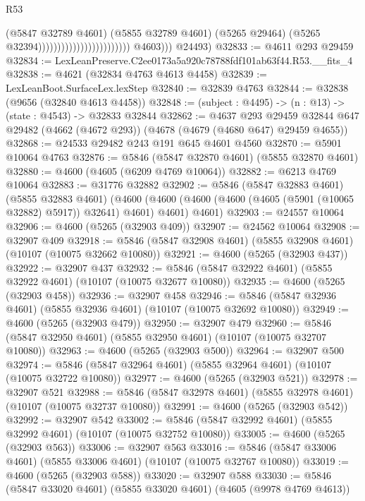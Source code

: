 \begin{lexlean}{R53}
\begin{coremodule}
                                                          (@5847 @32789 @4601)
                                                          (@5855 @32789 @4601)
                                                          (@5265 @29464)
                                                          (@5265 @32394))))))))))))))))))))))))
            @4603)))
      @24493)
@32833 := @4611 @293 @29459
@32834 := LexLeanPreserve.C2ee0173a5a920c78788fdf101ab63f44.R53.__fits_4
@32838 := @4621 (@32834 @4763 @4613 @4458)
@32839 := LexLeanBoot.SurfaceLex.lexStep
@32840 := @32839 @4763
@32844 := @32838 (@9656 (@32840 @4613 @4458))
@32848 := (subject : @4495) -> (n : @13) -> (state : @4543) -> @32833 @32844
@32862 := @4637
    @293
    @29459
    @32844
    @647
    @29482
    (@4662 (@4672 @293))
    (@4678 (@4679 (@4680 @647) @29459 @4655))
@32868 := @24533 @29482 @243 @191 @645 @4601 @4560
@32870 := @5901 @10064 @4763
@32876 := @5846 (@5847 @32870 @4601) (@5855 @32870 @4601)
@32880 := @4600 (@4605 (@6209 @4769 @10064))
@32882 := @6213 @4769 @10064
@32883 := @31776 @32882
@32902 := @5846
    (@5847 @32883 @4601)
    (@5855 @32883 @4601)
    (@4600 (@4600 (@4600 (@4600 (@4605 (@5901 (@10065 @32882) @5917)) @32641) @4601) @4601) @4601)
@32903 := @24557 @10064
@32906 := @4600 (@5265 (@32903 @409))
@32907 := @24562 @10064
@32908 := @32907 @409
@32918 := @5846 (@5847 @32908 @4601) (@5855 @32908 @4601) (@10107 (@10075 @32662 @10080))
@32921 := @4600 (@5265 (@32903 @437))
@32922 := @32907 @437
@32932 := @5846 (@5847 @32922 @4601) (@5855 @32922 @4601) (@10107 (@10075 @32677 @10080))
@32935 := @4600 (@5265 (@32903 @458))
@32936 := @32907 @458
@32946 := @5846 (@5847 @32936 @4601) (@5855 @32936 @4601) (@10107 (@10075 @32692 @10080))
@32949 := @4600 (@5265 (@32903 @479))
@32950 := @32907 @479
@32960 := @5846 (@5847 @32950 @4601) (@5855 @32950 @4601) (@10107 (@10075 @32707 @10080))
@32963 := @4600 (@5265 (@32903 @500))
@32964 := @32907 @500
@32974 := @5846 (@5847 @32964 @4601) (@5855 @32964 @4601) (@10107 (@10075 @32722 @10080))
@32977 := @4600 (@5265 (@32903 @521))
@32978 := @32907 @521
@32988 := @5846 (@5847 @32978 @4601) (@5855 @32978 @4601) (@10107 (@10075 @32737 @10080))
@32991 := @4600 (@5265 (@32903 @542))
@32992 := @32907 @542
@33002 := @5846 (@5847 @32992 @4601) (@5855 @32992 @4601) (@10107 (@10075 @32752 @10080))
@33005 := @4600 (@5265 (@32903 @563))
@33006 := @32907 @563
@33016 := @5846 (@5847 @33006 @4601) (@5855 @33006 @4601) (@10107 (@10075 @32767 @10080))
@33019 := @4600 (@5265 (@32903 @588))
@33020 := @32907 @588
@33030 := @5846 (@5847 @33020 @4601) (@5855 @33020 @4601) (@4605 (@9978 @4769 @4613))

\end{coremodule}
\end{lexlean}
